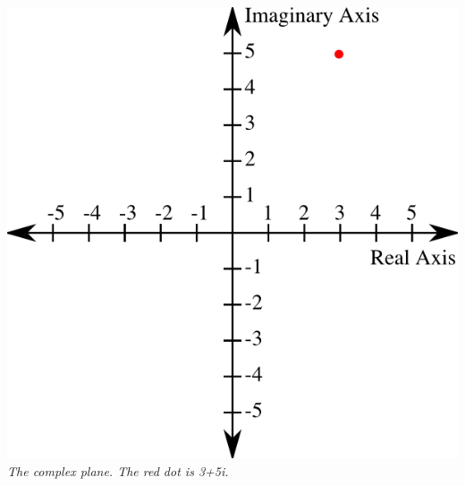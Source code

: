 \documentclass[]{article}
\begin{document}
		\begin{center}
			\includegraphics{./graphics/fig002.png}\\
			\emph{The complex plane. The red dot is 3+5i.}
		\end{center}\pagebreak
		
\end{document}
